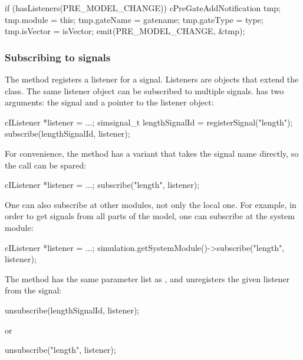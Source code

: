 \begin{cpp}
if (hasListeners(PRE_MODEL_CHANGE))
{
    cPreGateAddNotification tmp;
    tmp.module = this;
    tmp.gateName = gatename;
    tmp.gateType = type;
    tmp.isVector = isVector;
    emit(PRE_MODEL_CHANGE, &tmp);
}
\end{cpp}


\subsubsection{Subscribing to signals}

The  method registers a listener for a signal.
Listeners are objects that extend the  class.
The same listener object can be subscribed to multiple signals.
 has two arguments: the signal and a pointer to
the listener object:

\begin{cpp}
cIListener *listener = ...;
simsignal_t lengthSignalId = registerSignal("length");
subscribe(lengthSignalId, listener);
\end{cpp}

For convenience, the  method has a variant
that takes the signal name directly, so the 
call can be spared:

\begin{cpp}
cIListener *listener = ...;
subscribe("length", listener);
\end{cpp}

One can also subscribe at other modules, not only the local one.
For example, in order to get signals from all parts of the model,
one can subscribe at the system module:

\begin{cpp}
cIListener *listener = ...;
simulation.getSystemModule()->subscribe("length", listener);
\end{cpp}

The  method has the same parameter list
as , and unregisters the given listener
from the signal:

\begin{cpp}
unsubscribe(lengthSignalId, listener);
\end{cpp}

or

\begin{cpp}
unsubscribe("length", listener);
\end{cpp}

